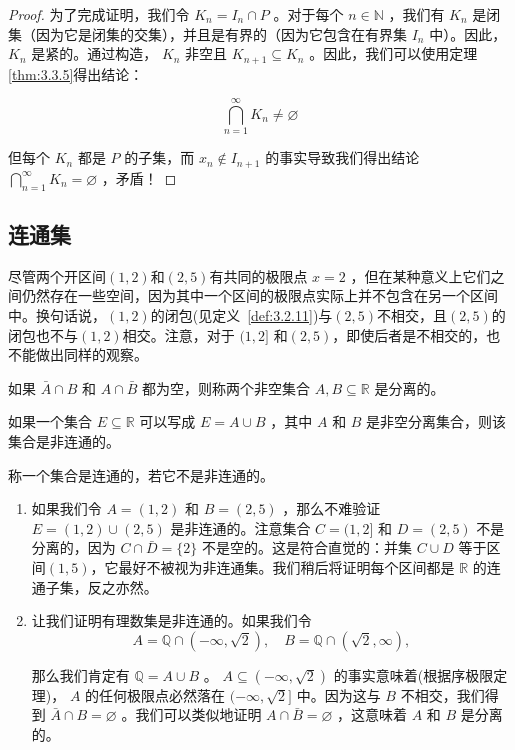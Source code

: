 \begin{proof}
为了完成证明，我们令 \({K}_{n} = {I}_{n} \cap  P\) 。对于每个 \(n \in  \mathbb{N}\) ，我们有 \({K}_{n}\) 是闭集（因为它是闭集的交集），并且是有界的（因为它包含在有界集 \({I}_{n}\) 中）。因此， \({K}_{n}\) 是紧的。通过构造， \({K}_{n}\) 非空且 \({K}_{n + 1} \subseteq  {K}_{n}\) 。因此，我们可以使用定理\ref{thm:3.3.5}得出结论：

\[
\mathop{\bigcap }\limits_{{n = 1}}^{\infty }{K}_{n} \neq  \varnothing
\]

但每个 \({K}_{n}\) 都是 \(P\) 的子集，而 \({x}_{n} \notin  {I}_{n + 1}\) 的事实导致我们得出结论 \(\mathop{\bigcap }\limits_{{n = 1}}^{\infty }{K}_{n} = \varnothing\) ，矛盾！  
\end{proof}


\subsection{连通集}
尽管两个开区间$(1,2)$和$(2,5)$有共同的极限点 \(x = 2\) ，但在某种意义上它们之间仍然存在一些空间，因为其中一个区间的极限点实际上并不包含在另一个区间中。换句话说，$(1,2)$的闭包(见定义~\ref{def:3.2.11})与$(2,5)$不相交，且$(2,5)$的闭包也不与$(1,2)$相交。注意，对于 \((1,2\rbrack\) 和$(2,5)$，即使后者是不相交的，也不能做出同样的观察。


\begin{Def}
  \label{def:3.4.4}
  如果 \(\bar{A} \cap  B\) 和 \(A \cap  \bar{B}\) 都为空，则称两个非空集合 \(A,B \subseteq  \mathbb{R}\) 是分离的。

  如果一个集合 \(E \subseteq  \mathbb{R}\) 可以写成 \(E = A \cup  B\) ，其中 \(A\) 和 \(B\) 是非空分离集合，则该集合是非连通的。

  称一个集合是连通的，若它不是非连通的。
\end{Def}


\begin{Eg}
  \label{eg:3.4.5}
  \begin{enumerate}[label = (\roman*)]
  \item\label{item:3.4.1}如果我们令 \(A = \left( {1,2}\right)\) 和 \(B = \left( {2,5}\right)\) ，那么不难验证 \(E = \left( {1,2}\right)  \cup  \left( {2,5}\right)\) 是非连通的。注意集合 \(C = (1,2\rbrack\) 和 \(D = \left( {2,5}\right)\) 不是分离的，因为 \(C \cap  \bar{D} = \{ 2\}\) 不是空的。这是符合直觉的：并集 \(C \cup  D\) 等于区间$(1,5)$，它最好不被视为非连通集。我们稍后将证明每个区间都是 \(\mathbb{R}\) 的连通子集，反之亦然。
  \item \label{item:3.4.2}让我们证明有理数集是非连通的。如果我们令
\[
A = \mathbb{Q} \cap  \left( {-\infty ,\sqrt{2}}\right) , \quad B = \mathbb{Q} \cap  \left( {\sqrt{2},\infty }\right) ,
\]

那么我们肯定有 \(\mathbb{Q} = A \cup  B\) 。 \(A \subseteq  \left( {-\infty ,\sqrt{2}}\right)\) 的事实意味着(根据序极限定理)， \(A\) 的任何极限点必然落在 \(( - \infty ,\sqrt{2}\rbrack\) 中。因为这与 \(B\) 不相交，我们得到 \(\bar{A} \cap  B = \varnothing\) 。我们可以类似地证明 \(A \cap  \bar{B} = \varnothing\) ，这意味着 \(A\) 和 \(B\) 是分离的。 
  \end{enumerate}
\end{Eg}

